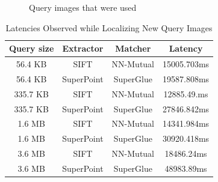 \documentclass[sigconf]{acmart}
\begin{document}
\begin{figure}[H]
    \qquad
    \caption{Query images that were used}
    \label{fig:Query}%
\end{figure}
  

\begin{table}[H]
  \caption{Latencies Observed while Localizing New Query Images}
  \label{tab:latencies}
  \begin{tabular}{cccc}
    \toprule
    Query size & Extractor & Matcher & Latency\\
    \midrule
    56.4 KB & SIFT & NN-Mutual & 15005.703ms\\
    56.4 KB & SuperPoint & SuperGlue & 19587.808ms\\
    335.7 KB & SIFT & NN-Mutual & 12885.49.ms\\
    335.7 KB & SuperPoint & SuperGlue & 27846.842ms\\
    1.6 MB & SIFT & NN-Mutual & 14341.984ms\\
    1.6 MB & SuperPoint & SuperGlue & 30920.418ms\\
    3.6 MB & SIFT & NN-Mutual & 18486.24ms\\
    3.6 MB & SuperPoint & SuperGlue & 48983.89ms\\
  \bottomrule
\end{tabular}
\end{table}
\end{document}
